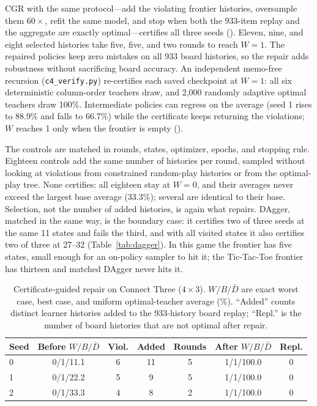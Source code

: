 \documentclass[conference]{IEEEtran}
\begin{document}
CGR with the same protocol---add the violating frontier histories, oversample them $60\times$, refit the same model, and stop when both the 933-item replay and the aggregate are exactly optimal---certifies all three seeds (). Eleven, nine, and eight selected histories take five, five, and two rounds to reach $W=1$. The repaired policies keep zero mistakes on all 933 board histories, so the repair adds robustness without sacrificing board accuracy. An independent memo-free recursion (\texttt{c4\_verify.py}) re-certifies each saved checkpoint at $W=1$: all six deterministic column-order teachers draw, and 2{,}000 randomly adaptive optimal teachers draw 100\%. Intermediate policies can regress on the average (seed 1 rises to 88.9\% and falls to 66.7\%) while the certificate keeps returning the violations; $W$ reaches 1 only when the frontier is empty ().

The controls are matched in rounds, states, optimizer, epochs, and stopping rule. Eighteen controls add the same number of histories per round, sampled without looking at violations from constrained random-play histories or from the optimal-play tree. None certifies: all eighteen stay at $W=0$, and their averages never exceed the largest base average (33.3\%); several are identical to their base. Selection, not the number of added histories, is again what repairs. DAgger, matched in the same way, is the boundary case: it certifies two of three seeds at the same 11 states and fails the third, and with all visited states it also certifies two of three at 27--32 (Table~\ref{tab:dagger}). In this game the frontier has five states, small enough for an on-policy sampler to hit it; the Tic-Tac-Toe frontier has thirteen and matched DAgger never hits it.

\begin{table}[t]
\centering
\caption{Certificate-guided repair on Connect Three ($4\times3$). $W/B/\bar D$ are exact worst case, best case, and uniform optimal-teacher average (\%). ``Added'' counts distinct learner histories added to the 933-history board replay; ``Repl.'' is the number of board histories that are not optimal after repair.}
\label{tab:c4}
\setlength{\tabcolsep}{3pt}
\footnotesize
\begin{tabular}{@{}lcccccc@{}}
\toprule
\textbf{Seed} & \textbf{Before $W/B/\bar D$} & \textbf{Viol.} & \textbf{Added} & \textbf{Rounds} & \textbf{After $W/B/\bar D$} & \textbf{Repl.} \\
\midrule
0 & 0/1/11.1 & 6 & 11 & 5 & 1/1/100.0 & 0 \\
1 & 0/1/22.2 & 5 & 9 & 5 & 1/1/100.0 & 0 \\
2 & 0/1/33.3 & 4 & 8 & 2 & 1/1/100.0 & 0 \\
\bottomrule
\end{tabular}
\end{table}
\end{document}
